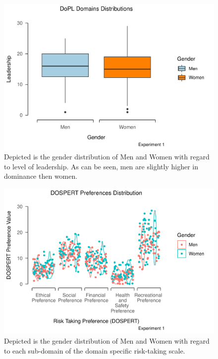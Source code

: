 \documentclass[
  donotrepeattitle,doc, 12pt, a4paper,floatsintext]{apa7}
\begin{document}
\begin{figure}
\centering
\includegraphics{Output_Files/DoPL-Experiment_files/figure-latex/LeadershipExperiment1-1.pdf}
\caption{\label{fig:LeadershipExperiment1}Depicted is the gender distribution of Men and Women with regard to level of leadership. As can be seen, men are slightly higher in dominance then women.}
\end{figure}

\begin{figure}
\centering
\includegraphics{Output_Files/DoPL-Experiment_files/figure-latex/DOSPERT-Preferences-GenderExperiment1-1.pdf}
\caption{\label{fig:DOSPERT-Preferences-GenderExperiment1}Depicted is the gender distribution of Men and Women with regard to each sub-domain of the domain specific risk-taking scale.}
\end{figure}
\end{document}
